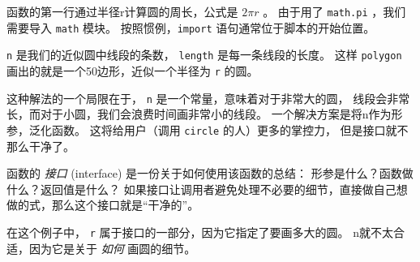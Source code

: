 
函数的第一行通过半径r计算圆的周长，公式是 $2 \pi r$ 。
由于用了 \lstinline{math.pi} ，我们需要导入 \lstinline{math} 模块。
按照惯例，\lstinline{import} 语句通常位于脚本的开始位置。


\lstinline{n} 是我们的近似圆中线段的条数， \lstinline{length} 是每一条线段的长度。
这样 \lstinline{polygon} 画出的就是一个50边形，近似一个半径为 \lstinline{r} 的圆。


这种解法的一个局限在于， \lstinline{n} 是一个常量，意味着对于非常大的圆，
线段会非常长，而对于小圆，我们会浪费时间画非常小的线段。
一个解决方案是将n作为形参，泛化函数。
这将给用户（调用 \lstinline{circle} 的人）更多的掌控力， 但是接口就不那么干净了。


函数的 \emph{接口} (interface) 是一份关于如何使用该函数的总结：
形参是什么？函数做什么？返回值是什么？
如果接口让调用者避免处理不必要的细节，直接做自己想做的式，那么这个接口就是``干净的''。


在这个例子中， \lstinline{r} 属于接口的一部分，因为它指定了要画多大的圆。
n就不太合适，因为它是关于 \emph{如何} 画圆的细节。

